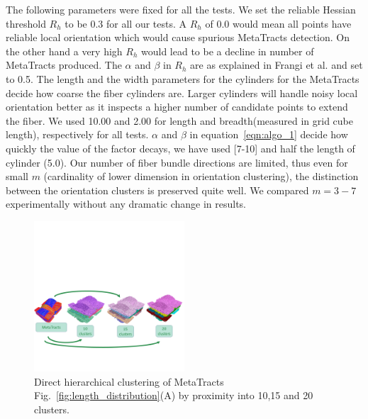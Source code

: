 The following parameters were fixed for all the tests. We set the reliable Hessian threshold $R_{h}$ to be 0.3 for all our tests. A $R_{h}$ of 0.0 would mean all points have reliable local orientation which would cause spurious MetaTracts detection. On the other hand a very high $ R_{h}$ would lead to be a decline in number of MetaTracts produced. The $\alpha$ and $\beta$ in $R_{h}$ are as explained in Frangi et al. \cite{Frangi1998} and set to 0.5. The length and the width parameters for the cylinders for the MetaTracts decide how coarse the fiber cylinders are. Larger cylinders will handle noisy local orientation better as it inspects a higher number of candidate points to extend the fiber. We used 10.00 and 2.00 for length and breadth(measured in grid cube length), respectively for all tests. $\alpha$ and $\beta$ in equation~\ref{eqn:algo_1} decide how quickly the value of the factor decays, we have used [7-10] and half the length of cylinder (5.0). Our number of fiber bundle directions are limited, thus even for small $m$ (cardinality of lower dimension in orientation clustering), the distinction between the orientation clusters is preserved quite well. We compared  $m=3-7$ experimentally without any dramatic change in results. 
\begin{figure}
	\centering
	\includegraphics[width=0.5\textwidth, trim = 0mm 80mm 0mm 170mm, clip]{images_pvis/figure10}
	\caption{Direct hierarchical clustering of MetaTracts Fig.~\ref{fig:length_distribution}(A) by proximity into 10,15 and 20 clusters.}
	\label{fig:comparison}
\end{figure} 


